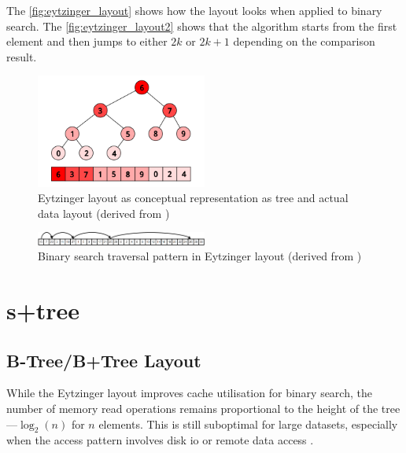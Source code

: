 The \autoref{fig:eytzinger_layout} shows how the layout looks when applied to binary search. The \autoref{fig:eytzinger_layout2} shows that the algorithm starts from the first element and then jumps to either $2k$ or $2k+1$ depending on the comparison result.

\begin{figure}[ht]
  \centering
  \includegraphics[width=0.5\textwidth]{figs/related_work_theoretical_bg/eytzinger_layout.png}
  \caption{Eytzinger layout as conceptual representation as tree and actual data layout (derived from \citet{binary_search})}
  \label{fig:eytzinger_layout}
\end{figure}
\begin{figure}[ht]
  \centering
  \includegraphics[width=0.5\textwidth]{figs/related_work_theoretical_bg/eytzinger_layout2.png}
  \caption{Binary search traversal pattern in Eytzinger layout (derived from \citet{binary_search})}
  \label{fig:eytzinger_layout2}
\end{figure}


\section{\texorpdfstring{\ac{s+tree}}{S+tree}}
\label{tb:static_btree}

\subsection{B-Tree/B+Tree Layout}
\label{tb:btree_layout}

While the Eytzinger layout improves cache utilisation for binary search, the number of memory read operations remains proportional to the height of the tree—$\log_2(n)$ for $n$ elements. This is still suboptimal for large datasets, especially when the access pattern involves disk \ac{io} or remote data access \citep{static_b_trees}.

